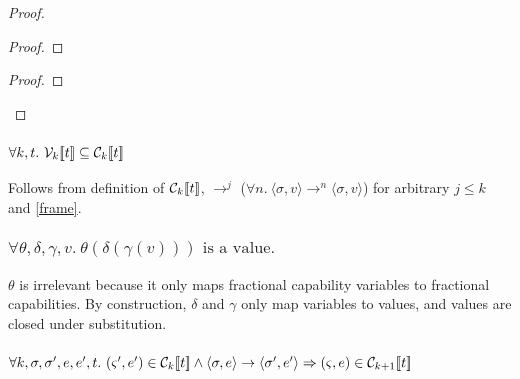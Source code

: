 \begin{proof}
\begin{proof}
    \end{proof}


    \begin{proof}







    \end{proof}

\end{proof}

\subsubsection{$\forall k, t.\ \mathcal{V}_{k} [\![ t ]\!] \subseteq \mathcal{C}_{k} [\![ t ]\!]$}\label{subsetVC}
Follows from definition of $\mathcal{C}_{k} [\![ t ]\!]$, $\rightarrow^j$ ($\forall n.\ \langle
\sigma , v \rangle \rightarrow^n \langle \sigma , v \rangle$) for arbitrary
$j \leq k$ and \ref{frame}.

\subsubsection{$\forall \theta, \delta, \gamma, v.\ \theta(\delta(\gamma(v)))\textrm{ is a value.}$}\label{valueSub}

$\theta$ is irrelevant because it only maps fractional capability variables to
fractional capabilities. By construction, $\delta$ and $\gamma$ only map
variables to values, and values are closed under substitution.

\subsubsection{$
    \forall k, \sigma, \sigma', e, e', t.  \ (\varsigma', e') \in \mathcal{C}_{k} [\![ t ]\!] \wedge
    \langle \sigma, e \rangle \rightarrow \langle \sigma', e' \rangle
    \Rightarrow (\varsigma, e) \in \mathcal{C}_{k+1} [\![ t ]\!]
$}\label{stepInC}

